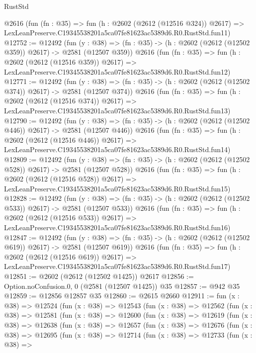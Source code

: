 \begin{lexlean}{RustStd}
\begin{coremodule}
    @2616
    (fun (fn : @35) =>
    fun (h : @2602 (@2612 (@12516 @324)) @2617) =>
    LexLeanPreserve.C19345538201a5ca07fe81623ac5389d6.R0.RustStd.fun11)
@12752 := @12492
    (fun (y : @38) => (fn : @35) -> (h : @2602 (@2612 (@12502 @359)) @2617) -> @2581 (@12507 @359))
    @2616
    (fun (fn : @35) =>
    fun (h : @2602 (@2612 (@12516 @359)) @2617) =>
    LexLeanPreserve.C19345538201a5ca07fe81623ac5389d6.R0.RustStd.fun12)
@12771 := @12492
    (fun (y : @38) => (fn : @35) -> (h : @2602 (@2612 (@12502 @374)) @2617) -> @2581 (@12507 @374))
    @2616
    (fun (fn : @35) =>
    fun (h : @2602 (@2612 (@12516 @374)) @2617) =>
    LexLeanPreserve.C19345538201a5ca07fe81623ac5389d6.R0.RustStd.fun13)
@12790 := @12492
    (fun (y : @38) => (fn : @35) -> (h : @2602 (@2612 (@12502 @446)) @2617) -> @2581 (@12507 @446))
    @2616
    (fun (fn : @35) =>
    fun (h : @2602 (@2612 (@12516 @446)) @2617) =>
    LexLeanPreserve.C19345538201a5ca07fe81623ac5389d6.R0.RustStd.fun14)
@12809 := @12492
    (fun (y : @38) => (fn : @35) -> (h : @2602 (@2612 (@12502 @528)) @2617) -> @2581 (@12507 @528))
    @2616
    (fun (fn : @35) =>
    fun (h : @2602 (@2612 (@12516 @528)) @2617) =>
    LexLeanPreserve.C19345538201a5ca07fe81623ac5389d6.R0.RustStd.fun15)
@12828 := @12492
    (fun (y : @38) => (fn : @35) -> (h : @2602 (@2612 (@12502 @533)) @2617) -> @2581 (@12507 @533))
    @2616
    (fun (fn : @35) =>
    fun (h : @2602 (@2612 (@12516 @533)) @2617) =>
    LexLeanPreserve.C19345538201a5ca07fe81623ac5389d6.R0.RustStd.fun16)
@12847 := @12492
    (fun (y : @38) => (fn : @35) -> (h : @2602 (@2612 (@12502 @619)) @2617) -> @2581 (@12507 @619))
    @2616
    (fun (fn : @35) =>
    fun (h : @2602 (@2612 (@12516 @619)) @2617) =>
    LexLeanPreserve.C19345538201a5ca07fe81623ac5389d6.R0.RustStd.fun17)
@12851 := @2602 (@2612 (@12502 @1425)) @2617
@12856 := Option.noConfusion.{0, 0} (@2581 (@12507 @1425)) @35
@12857 := @942 @35
@12859 := @12856 @12857 @35
@12860 := @2615 @2660
@12911 := fun (x : @38) =>
  @12524
    (fun (x : @38) =>
    @12543
      (fun (x : @38) =>
      @12562
        (fun (x : @38) =>
        @12581
          (fun (x : @38) =>
          @12600
            (fun (x : @38) =>
            @12619
              (fun (x : @38) =>
              @12638
                (fun (x : @38) =>
                @12657
                  (fun (x : @38) =>
                  @12676
                    (fun (x : @38) =>
                    @12695
                      (fun (x : @38) =>
                      @12714
                        (fun (x : @38) =>
                        @12733
                          (fun (x : @38) =>

\end{coremodule}
\end{lexlean}
